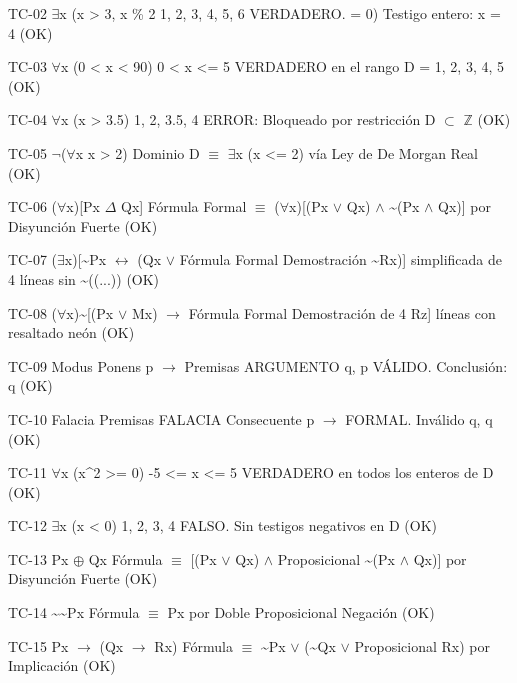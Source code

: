 \documentclass[11pt,a4paper]{article}
\begin{document}
TC-02             $ \exists $x (x > 3, x \% 2  1, 2, 3, 4, 5, 6   VERDADERO.
= 0)                                Testigo entero: x
= 4 (OK)

TC-03             $ \forall $x (0 < x < 90)   0 < x <= 5         VERDADERO en
el rango D = {1,
2, 3, 4, 5} (OK)

TC-04             $ \forall $x (x > 3.5)      1, 2, 3.5, 4       ERROR:
Bloqueado por
restricción D $ \subset $ $\mathbb{Z}$
(OK)

TC-05             $ \lnot $($ \forall $x x > 2)       Dominio D         $ \equiv $ $ \exists $x (x <= 2) vía
Ley de De Morgan
Real (OK)

TC-06             ($ \forall $x)[Px $ \Delta $ Qx]     Fórmula Formal    $ \equiv $ ($ \forall $x)[(Px $ \lor $ Qx)
$ \land $ \textasciitilde{}(Px $ \land $ Qx)] por
Disyunción Fuerte
(OK)

TC-07             ($ \exists $x)[\textasciitilde{}Px $ \leftrightarrow $ (Qx $ \lor $  Fórmula Formal    Demostración
\textasciitilde{}Rx)]                               simplificada de 4
líneas sin
\textasciitilde{}((...)) (OK)

TC-08             ($ \forall $x)\textasciitilde{}[(Px $ \lor $ Mx) $ \to $ Fórmula Formal    Demostración de 4
Rz]                                 líneas con
resaltado neón
(OK)

TC-09             Modus Ponens p $ \to $  Premisas           ARGUMENTO
q, p                                VÁLIDO.
Conclusión: q
(OK)

TC-10             Falacia           Premisas           FALACIA
Consecuente p $ \to $                     FORMAL. Inválido
q, q                                (OK)

TC-11             $ \forall $x (x\textasciicircum{}2 >= 0)     -5 <= x <= 5       VERDADERO en
todos los enteros
de D (OK)

TC-12             $ \exists $x (x < 0)        1, 2, 3, 4         FALSO. Sin
testigos
negativos en D
(OK)

TC-13             Px $ \oplus $ Qx           Fórmula           $ \equiv $ [(Px $ \lor $ Qx) $ \land $
Proposicional     \textasciitilde{}(Px $ \land $ Qx)] por
Disyunción Fuerte
(OK)

TC-14             \textasciitilde{}\textasciitilde{}Px              Fórmula           $ \equiv $ Px por Doble
Proposicional     Negación (OK)

TC-15             Px $ \to $ (Qx $ \to $ Rx)    Fórmula           $ \equiv $ \textasciitilde{}Px $ \lor $ (\textasciitilde{}Qx $ \lor $
Proposicional     Rx) por
Implicación (OK)
\end{document}
